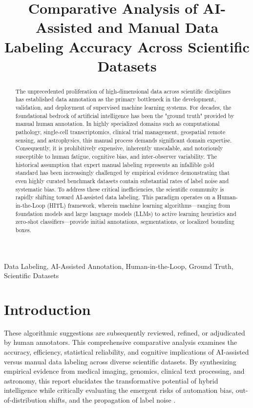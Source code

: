 \documentclass[conference]{IEEEtran}
\begin{document}
\title{Comparative Analysis of AI-Assisted and Manual Data Labeling Accuracy Across Scientific Datasets}

\author{
}

\maketitle

\begin{abstract}
The unprecedented proliferation of high-dimensional data across scientific disciplines has established data annotation as the primary bottleneck in the development, validation, and deployment of supervised machine learning systems. For decades, the foundational bedrock of artificial intelligence has been the "ground truth" provided by manual human annotation. In highly specialized domains such as computational pathology, single-cell transcriptomics, clinical trial management, geospatial remote sensing, and astrophysics, this manual process demands significant domain expertise. Consequently, it is prohibitively expensive, inherently unscalable, and notoriously susceptible to human fatigue, cognitive bias, and inter-observer variability. The historical assumption that expert manual labeling represents an infallible gold standard has been increasingly challenged by empirical evidence demonstrating that even highly curated benchmark datasets contain substantial rates of label noise and systematic bias. To address these critical inefficiencies, the scientific community is rapidly shifting toward AI-assisted data labeling. This paradigm operates on a Human-in-the-Loop (HITL) framework, wherein machine learning algorithms---ranging from foundation models and large language models (LLMs) to active learning heuristics and zero-shot classifiers---provide initial annotations, segmentations, or localized bounding boxes.
\end{abstract}

\begin{IEEEkeywords}
Data Labeling, AI-Assisted Annotation, Human-in-the-Loop, Ground Truth, Scientific Datasets
\end{IEEEkeywords}

\section{Introduction}
These algorithmic suggestions are subsequently reviewed, refined, or adjudicated by human annotators. This comprehensive comparative analysis examines the accuracy, efficiency, statistical reliability, and cognitive implications of AI-assisted versus manual data labeling across diverse scientific datasets. By synthesizing empirical evidence from medical imaging, genomics, clinical text processing, and astronomy, this report elucidates the transformative potential of hybrid intelligence while critically evaluating the emergent risks of automation bias, out-of-distribution shifts, and the propagation of label noise \cite{ref1}.
\end{document}
